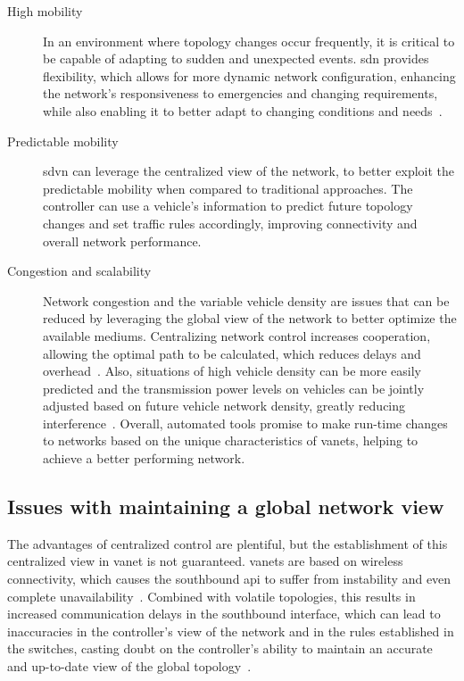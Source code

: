 \begin{description}
    \item[High mobility] In an environment where topology changes occur frequently, it is critical to be capable of adapting to sudden and unexpected events. \gls{sdn} provides flexibility, which allows for more dynamic network configuration, enhancing the network's responsiveness to emergencies and changing requirements, while also enabling it to better adapt to changing conditions and needs~\cite{ku_towards_2014}.
    \item[Predictable mobility] \gls{sdvn} can leverage the centralized view of the network, to better exploit the predictable mobility when compared to traditional approaches. The controller can use a vehicle's information to predict future topology changes and set traffic rules accordingly, improving connectivity and overall network performance.  
    \item[Congestion and scalability] Network congestion and the variable vehicle density are issues that can be reduced by leveraging the global view of the network to better optimize the available mediums. Centralizing network control increases cooperation, allowing the optimal path to be calculated, which reduces delays and overhead~\cite{smida_efficient_2020}. Also, situations of high vehicle density can be more easily predicted and the transmission power levels on vehicles can be jointly adjusted based on future vehicle network density, greatly reducing interference~\cite{smida_efficient_2020}. Overall, automated tools promise to make run-time changes to networks based on the unique characteristics of \glspl{vanet}, helping to achieve a better performing network.
\end{description}

\subsection{Issues with maintaining a global network view}
\label{subsec:issues_with_maintaining_a_global_network_view}

The advantages of centralized control are plentiful, but the establishment of this centralized view in \gls{vanet} is not guaranteed. \glspl{vanet} are based on wireless connectivity, which causes the southbound \gls{api} to suffer from instability and even complete unavailability~\cite{cardona_software-defined_2020}. Combined with volatile topologies, this results in increased communication delays in the southbound interface, which can lead to inaccuracies in the controller's view of the network and in the rules established in the switches, casting doubt on the controller's ability to maintain an accurate and up-to-date view of the global topology~\cite{ben_jaballah_security_2020}. 

